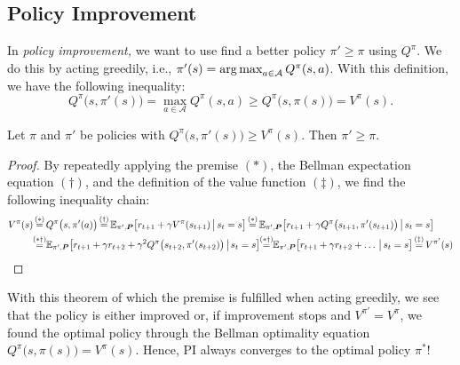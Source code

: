 		\subsection{Policy Improvement}
			In \emph{policy improvement,} we want to use find a better policy \(\pi' \geq \pi\) using \(Q^\pi\). We do this by acting greedily, i.e., \( \pi'(s) = \operatorname*{arg\,max}_{a \in \mathcal{A}} Q^\pi(s, a) \). With this definition, we have the following inequality:
			\begin{equation}
				Q^\pi\bigl( s, \pi'(s) \bigr)
					= \max_{a \in \mathcal{A}} Q^\pi(s, a)
					\geq Q^\pi\bigl( s, \pi(s) \bigr)
					= V^\pi(s).
			\end{equation}
			\begin{theorem}  \label{th:policyImprovement}
				Let \(\pi\) and \(\pi'\) be policies with \( Q^\pi\bigl( s, \pi'(s) \bigr) \geq V^\pi(s) \). Then \( \pi' \geq \pi \).
			\end{theorem}
			\begin{proof}
				By repeatedly applying the premise \((\ast)\), the Bellman expectation equation \((\dagger)\), and the definition of the value function \((\ddagger)\), we find the following inequality chain:
				\begin{align}
					V^\pi(s)
						&\overset{\mathclap{(\ast)}}{=} Q^\pi\bigl( s, \pi'(a) \bigr)
						 \overset{\mathclap{(\dagger)}}{=} \E_{\pi', \mat{P}}\bigl[ r_{t + 1} + \gamma V^\pi(s_{t + 1}) \biggiven s_t = s \bigr]
						 \overset{\mathclap{(\ast)}}{=} \E_{\pi', \mat{P}}\bigl[ r_{t + 1} + \gamma Q^\pi\bigl( s_{t + 1}, \pi'(s_{t + 1}) \bigr) \biggiven s_t = s \bigr] \\
						&\overset{\mathclap{(\ast\dagger)}}{=} \E_{\pi', \mat{P}}\bigl[ r_{t + 1} + \gamma r_{t + 2} + \gamma^2 Q^\pi\bigl( s_{t + 2}, \pi'(s_{t + 2}) \bigr) \biggiven s_t = s \bigr]
						 \overset{\mathclap{(\ast\dagger)}}{=} \E_{\pi', \mat{P}}\bigl[ r_{t + 1} + \gamma r_{t + 2} + \dots \biggiven s_t = s \bigr]
						 \overset{\mathclap{(\ddagger)}}{=} V^{\pi'}(s)
				\end{align}
			\end{proof}

			With this theorem of which the premise is fulfilled when acting greedily, we see that the policy is either improved or, if improvement stops and \( V^{\pi'} = V^\pi \), we found the optimal policy through the Bellman optimality equation \( Q^\pi\bigl( s, \pi(s) \bigr) = V^\pi(s) \). Hence, \ac{PI} always converges to the optimal policy \(\pi^\ast\)!

